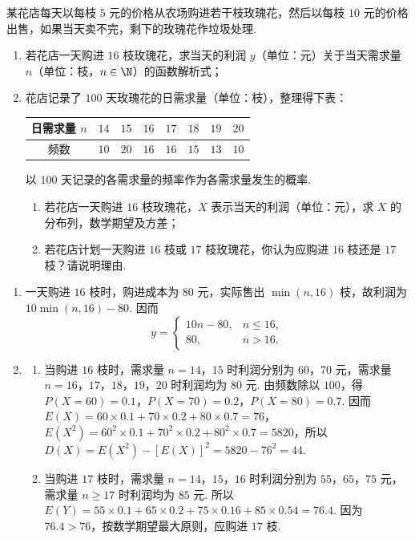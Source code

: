 \begin{problem}
某花店每天以每枝 \(5\) 元的价格从农场购进若干枝玫瑰花，然后以每枝 \(10\) 元的价格出售，如果当天卖不完，剩下的玫瑰花作垃圾处理.

\begin{enumerate}
\item 若花店一天购进 \(16\) 枝玫瑰花，求当天的利润 \(y\)（单位：元）关于当天需求量 \(n\)（单位：枝，\(n \in \N\)）的函数解析式；
\item 花店记录了 \(100\) 天玫瑰花的日需求量（单位：枝），整理得下表：

\begin{center}
\renewcommand{\arraystretch}{1.2}
\begin{tabular}{|c|c|c|c|c|c|c|c|}
\hline
日需求量 \(n\) & \(14\) & \(15\) & \(16\) & \(17\) & \(18\) & \(19\) & \(20\) \\
\hline
频数 & \(10\) & \(20\) & \(16\) & \(16\) & \(15\) & \(13\) & \(10\) \\
\hline
\end{tabular}
\end{center}

以 \(100\) 天记录的各需求量的频率作为各需求量发生的概率.

\begin{enumerate}
\item 若花店一天购进 \(16\) 枝玫瑰花，\(X\) 表示当天的利润（单位：元），求 \(X\) 的分布列，数学期望及方差；
\item 若花店计划一天购进 \(16\) 枝或 \(17\) 枝玫瑰花，你认为应购进 \(16\) 枝还是 \(17\) 枝？请说明理由.
\end{enumerate}
\end{enumerate}
\end{problem}

\begin{solution}
\begin{enumerate}
\item 一天购进 \(16\) 枝时，购进成本为 \(80\) 元，实际售出 \(\min(n,16)\) 枝，故利润为 \(10\min(n,16)-80\). 因而
\[
y=
\begin{cases}
10n-80,&n\leqslant16,\\
80,&n>16.
\end{cases}
\]
\item
\begin{enumerate}
\item 当购进 \(16\) 枝时，需求量 \(n=14\)，\(15\) 时利润分别为 \(60\)，\(70\) 元，需求量 \(n=16\)，\(17\)，\(18\)，\(19\)，\(20\) 时利润均为 \(80\) 元. 由频数除以 \(100\)，得 \(P(X=60)=0.1\)，\(P(X=70)=0.2\)，\(P(X=80)=0.7\). 因而 \(E(X)=60\times0.1+70\times0.2+80\times0.7=76\)，\(E(X^2)=60^2\times0.1+70^2\times0.2+80^2\times0.7=5820\)，所以 \(D(X)=E(X^2)-[E(X)]^2=5820-76^2=44\).
\item 当购进 \(17\) 枝时，需求量 \(n=14\)，\(15\)，\(16\) 时利润分别为 \(55\)，\(65\)，\(75\) 元，需求量 \(n\geqslant17\) 时利润均为 \(85\) 元. 所以 \(E(Y)=55\times0.1+65\times0.2+75\times0.16+85\times0.54=76.4\). 因为 \(76.4>76\)，按数学期望最大原则，应购进 \(17\) 枝.
\end{enumerate}
\end{enumerate}
\end{solution}

